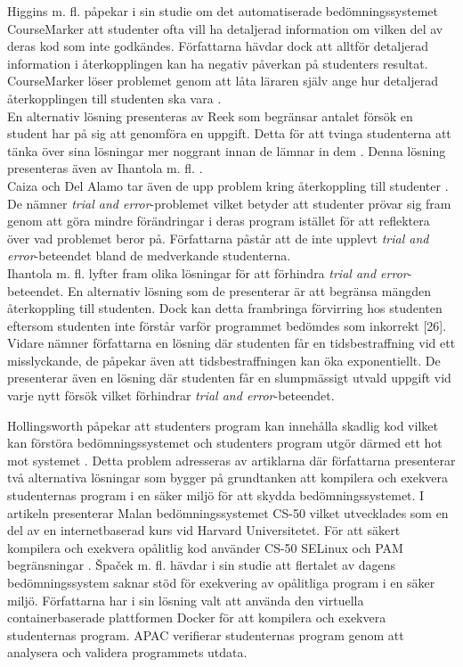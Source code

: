\documentclass[a4paper,11pt]{article}
\begin{document}
{Higgins m. fl. \cite{higgins_3} påpekar i sin studie om det automatiserade bedömningssystemet CourseMarker \cite{higgins_coursemarker_12} att studenter ofta vill ha detaljerad information om vilken del av deras kod som inte godkändes. Författarna hävdar dock att alltför detaljerad information i återkopplingen kan ha negativ påverkan på studenters resultat. CourseMarker löser problemet genom att låta läraren själv ange hur detaljerad återkopplingen till studenten ska vara \cite{higgins_3} \cite{caiza_7} \cite{douce_11}.
\\
En alternativ lösning presenteras av Reek som begränsar antalet försök en student har på sig att genomföra en uppgift. Detta för att tvinga studenterna att tänka över sina lösningar mer noggrant innan de lämnar in dem \cite{reek_6}. Denna lösning presenteras även av Ihantola m. fl. \cite{ihantola}.
\\
Caiza och Del Alamo tar även de upp problem kring återkoppling till studenter \cite{caiza_7}. De nämner \textit{trial and error}-problemet vilket betyder att studenter prövar sig fram genom att göra mindre förändringar i deras program istället för att reflektera över vad problemet beror på. Författarna påstår att de inte upplevt \textit{trial and error}-beteendet bland de medverkande studenterna.
\\
Ihantola m. fl. \cite{ihantola} lyfter fram olika lösningar för att förhindra \textit{trial and error}-beteendet.  En alternativ lösning som de presenterar är att begränsa mängden återkoppling till studenten. Dock kan detta frambringa förvirring hos studenten eftersom studenten inte förstår varför programmet bedömdes som inkorrekt [26]. Vidare nämner författarna en lösning där studenten får en tidsbestraffning vid ett misslyckande, de påpekar även att tidsbestraffningen kan öka exponentiellt.
De presenterar även en lösning där studenten får en slumpmässigt utvald uppgift vid varje nytt försök vilket förhindrar \textit{trial and error}-beteendet. 

Hollingsworth påpekar att studenters program kan innehålla skadlig kod vilket kan förstöra bedömningssystemet och studenters program utgör därmed ett hot mot systemet \cite{hollingsworth_2}. Detta problem adresseras av artiklarna \cite{spacek_13} \cite{cs50_8} \cite{ihantola} där författarna presenterar två alternativa lösningar som bygger på grundtanken att kompilera och exekvera studenternas program i en säker miljö för att skydda bedömningssystemet. I artikeln \cite{cs50_8} presenterar Malan bedömningssystemet CS-50 vilket utvecklades som en del av en internetbaserad kurs vid Harvard Universitetet. För att säkert kompilera och exekvera opålitlig kod använder CS-50 SELinux \cite{selinux} och PAM begränsningar \cite{pambegransningar}. Špaček m. fl. \cite{spacek_13} hävdar i sin studie att flertalet av dagens bedömningssystem saknar stöd för exekvering av opålitliga program i en säker miljö. Författarna har i sin lösning valt att använda den virtuella containerbaserade plattformen Docker \cite{docker} för att kompilera och exekvera studenternas program. APAC verifierar studenternas program genom att analysera och validera programmets utdata.

}
\end{document}
